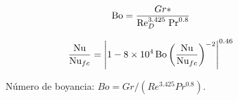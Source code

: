 \begin{equation}
\text{Bo}= \frac{Gr*}{\text{Re}_D^{3.425} \hspace*{1mm} \text{Pr}^{0.8}}
\label{eq:jackson_bo}
\end{equation}

\begin{equation}
\frac{\text{Nu}}{\text{Nu}_{fc}} =
\left\vert 1 - 8 \times 10^4 \hspace*{0.5mm} \text{Bo}
\left( \frac{\text{Nu}}{\text{Nu}_{fc}} \right)^{-2} \right\vert^{0.46}
\label{eq:jackson_corr}
\end{equation}

\begin{figure}[H]
  \centering
  \caption{Número de boyancia: $Bo = Gr / (Re^{3.425} Pr^{0.8})$.}
  \label{fig:nusselt}
\end{figure}



